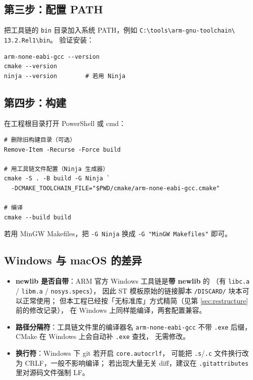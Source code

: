 \subsection{第三步：配置 PATH}

把工具链的 \texttt{bin} 目录加入系统 PATH，例如
\texttt{C:\textbackslash tools\textbackslash arm-gnu-toolchain\textbackslash
13.2.Rel1\textbackslash bin}。
验证安装：

\begin{lstlisting}[style=bash]
arm-none-eabi-gcc --version
cmake --version
ninja --version        # 若用 Ninja
\end{lstlisting}

\subsection{第四步：构建}

在工程根目录打开 PowerShell 或 cmd：

\begin{lstlisting}[style=bash]
# 删除旧构建目录（可选）
Remove-Item -Recurse -Force build

# 用工具链文件配置（Ninja 生成器）
cmake -S . -B build -G Ninja `
  -DCMAKE_TOOLCHAIN_FILE="$PWD/cmake/arm-none-eabi-gcc.cmake"

# 编译
cmake --build build
\end{lstlisting}

若用 MinGW Makefiles，把 \texttt{-G Ninja} 换成 \texttt{-G "MinGW Makefiles"} 即可。

\subsection{Windows 与 macOS 的差异}

\begin{itemize}
  \item \textbf{newlib 是否自带}：ARM 官方 Windows 工具链是\textbf{带 newlib} 的
        （有 \texttt{libc.a} / \texttt{libm.a} / \texttt{nosys.specs}），
        因此 ST 模板原始的链接脚本 \texttt{/DISCARD/} 块本可以正常使用；
        但本工程已经按「无标准库」方式精简（见第 \ref{sec:restructure} 前的修改记录），
        在 Windows 上同样能编译，两套配置兼容。
  \item \textbf{路径分隔符}：工具链文件里的编译器名 \texttt{arm-none-eabi-gcc}
        不带 \texttt{.exe} 后缀，CMake 在 Windows 上会自动补 \texttt{.exe} 查找，
        无需修改。
  \item \textbf{换行符}：Windows 下 git 若开启 \texttt{core.autocrlf}，
        可能把 \texttt{.s}/\texttt{.c} 文件换行改为 CRLF，一般不影响编译；
        若出现大量无关 diff，建议在 \texttt{.gitattributes} 里对源码文件强制 LF。
\end{itemize}

